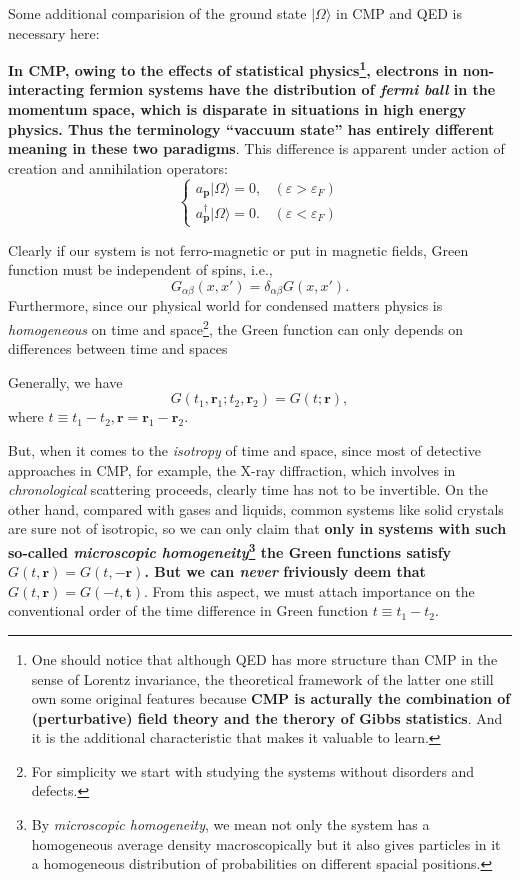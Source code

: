 \documentclass[b5paper,10pt,UTF8]{book}
\numberwithin{equation}{section}
\begin{document}
		\begin{Note}
			Some additional comparision of the ground state $|\Omega\rangle$ in CMP and QED is necessary here:\par
			\textbf{In CMP, owing to the effects of statistical physics\footnote{One should notice that although QED has more structure than CMP in the sense of Lorentz invariance, the theoretical framework of the latter one still own some original features because \textbf{CMP is acturally the combination of (perturbative) field theory and the therory of Gibbs statistics}. And it is the additional characteristic that makes it valuable to learn.}, electrons in non-interacting fermion systems have the distribution of \emph{fermi ball} in the momentum space, which is disparate in situations in high energy physics. Thus the terminology ``vaccuum state'' has entirely different meaning in these two paradigms}. This difference is apparent under action of creation and annihilation operators:
			$$\begin{cases}a_{\bm{p}}|\Omega\rangle=0,&(\varepsilon>\varepsilon_F)\\a_{\bm{p}}^\dagger|\Omega\rangle=0.&(\varepsilon<\varepsilon_F)\end{cases}$$
		\end{Note}
		\hfill\par
		Clearly if our system is not ferro-magnetic or put in magnetic fields, Green function must be independent of spins, i.e.,
		$$G_{\alpha\beta}(x,x')=\delta_{\alpha\beta}G(x,x').$$
		\indent Furthermore, since our physical world for condensed matters physics is \emph{homogeneous} on time and space\footnote{For simplicity we start with studying the systems without disorders and defects.}, the Green function can only depends on differences between time and spaces
		\begin{Assertion}
			Generally, we have
			\begin{equation}\label{2.2.3}
				G(t_1,\bm{r}_1;t_2,\bm{r}_2)=G(t;\bm{r}),
			\end{equation}
			where $t\equiv t_1-t_2, \bm{r}=\bm{r}_1-\bm{r}_2$.
		\end{Assertion}
		But, when it comes to the \emph{isotropy} of time and space, since most of detective approaches in CMP, for example, the X-ray diffraction, which involves in \emph{chronological} scattering proceeds, clearly time has not to be invertible. On the other hand, compared with gases and liquids, common systems like solid crystals are sure not of isotropic, so we can only claim that \textbf{only in systems with such so-called \emph{microscopic homogeneity}\footnote{By \emph{microscopic homogeneity}, we mean not only the system has a homogeneous average density macroscopically but it also gives particles in it a homogeneous distribution of probabilities on different spacial positions.} the Green functions satisfy $G(t,\bm{r})=G(t,-\bm{r})$. But we can \emph{never} friviously deem that $G(t,\bm{r})=G(-t,\bm{t})$}. From this aspect, we must attach importance on the conventional order of the time difference in Green function $t\equiv t_1-t_2$.
		
\end{document}
